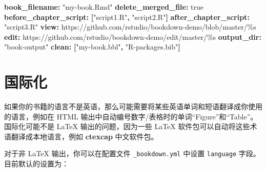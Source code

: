 \documentclass[
  12pt,
]{krantz}
\newenvironment{Shaded}{\begin{snugshade}}{\end{snugshade}}
\newcommand{\AttributeTok}[1]{\textcolor[rgb]{0.13,0.29,0.53}{#1}}
\newcommand{\CharTok}[1]{\textcolor[rgb]{0.31,0.60,0.02}{#1}}
\newcommand{\FunctionTok}[1]{\textcolor[rgb]{0.13,0.29,0.53}{\textbf{#1}}}
\newcommand{\KeywordTok}[1]{\textcolor[rgb]{0.13,0.29,0.53}{\textbf{#1}}}
\newcommand{\StringTok}[1]{\textcolor[rgb]{0.31,0.60,0.02}{#1}}
\theoremstyle{definition}
\theoremstyle{definition}
\theoremstyle{definition}
\theoremstyle{definition}
\theoremstyle{remark}
\begin{document}
\begin{Shaded}
\begin{Highlighting}[]
\FunctionTok{book\_filename}\KeywordTok{:}\AttributeTok{ }\StringTok{"my{-}book.Rmd"}
\FunctionTok{delete\_merged\_file}\KeywordTok{:}\AttributeTok{ }\CharTok{true}
\FunctionTok{before\_chapter\_script}\KeywordTok{:}\AttributeTok{ }\KeywordTok{[}\StringTok{"script1.R"}\KeywordTok{,}\AttributeTok{ }\StringTok{"script2.R"}\KeywordTok{]}
\FunctionTok{after\_chapter\_script}\KeywordTok{:}\AttributeTok{ }\StringTok{"script3.R"}
\FunctionTok{view}\KeywordTok{:}\AttributeTok{ https://github.com/rstudio/bookdown{-}demo/blob/master/\%s}
\FunctionTok{edit}\KeywordTok{:}\AttributeTok{ https://github.com/rstudio/bookdown{-}demo/edit/master/\%s}
\FunctionTok{output\_dir}\KeywordTok{:}\AttributeTok{ }\StringTok{"book{-}output"}
\FunctionTok{clean}\KeywordTok{:}\AttributeTok{ }\KeywordTok{[}\StringTok{"my{-}book.bbl"}\KeywordTok{,}\AttributeTok{ }\StringTok{"R{-}packages.bib"}\KeywordTok{]}
\end{Highlighting}
\end{Shaded}

\hypertarget{internationalization}{%
\section{国际化}\label{internationalization}}

如果你的书籍的语言不是英语，那么可能需要将某些英语单词和短语翻译成你使用的语言，例如在 HTML 输出中自动编号数字/表格时的单词``Figure''和``Table''。国际化可能不是 LaTeX 输出的问题，因为一些 LaTeX 软件包可以自动将这些术语翻译成本地语言，例如 \textbf{ctexcap} 中文软件包。

对于非 LaTeX 输出，你可以在配置文件 \texttt{\_bookdown.yml} 中设置 \texttt{language} 字段。目前默认的设置为：
\end{document}
